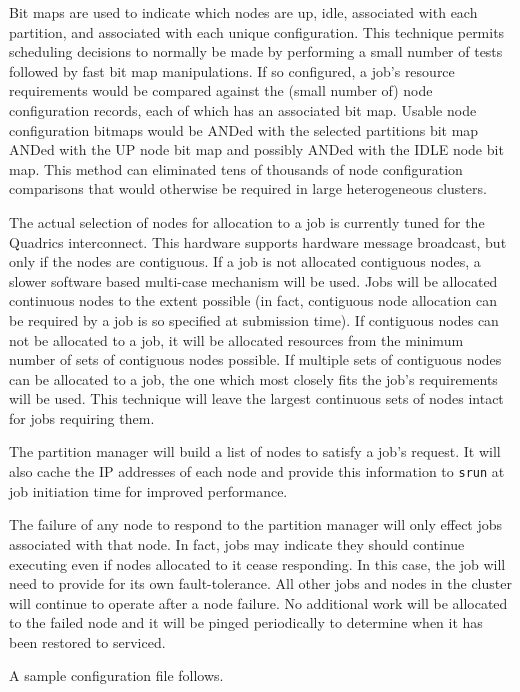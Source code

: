 Bit maps are used to indicate which nodes are up, idle, associated
with each partition, and associated with each unique configuration.
This technique permits scheduling decisions to normally be made by
performing a small number of tests followed by fast bit map manipulations. 
If so configured, a job's resource requirements would be compared 
against the (small number of) node configuration records, each of 
which has an associated bit map. Usable node configuration bitmaps 
would be ANDed with the selected partitions bit map ANDed with the 
UP node bit map and possibly ANDed with the IDLE node bit map. 
This method can eliminated tens of thousands of node configuration 
comparisons that would otherwise be required in large heterogeneous 
clusters.

The actual selection of nodes for allocation to a job is currently
tuned for the Quadrics interconnect.  This hardware supports hardware
message broadcast, but only if the nodes are contiguous.  If a job
is not allocated contiguous nodes, a slower software based multi-case
mechanism will be used.  Jobs will be allocated continuous nodes to the
extent possible (in fact, contiguous node allocation can be required
by a job is so specified at submission time).  If contiguous nodes
can not be allocated to a job, it will be allocated resources from
the minimum number of sets of contiguous nodes possible.  If multiple
sets of contiguous nodes can be allocated to a job, the one which most
closely fits the job's requirements will be used.  This technique will
leave the largest continuous sets of nodes intact for jobs requiring them.

The partition manager will build a list of nodes to satisfy a job's
request.  It will also cache the IP addresses of
each node and provide this information to {\tt srun} at job initiation
time for improved performance.

The failure of any node to respond to the partition manager will only
effect jobs associated with that node.  In fact, jobs may indicate they
should continue executing even if nodes allocated to it cease responding.
In this case, the job will need to provide for its own fault-tolerance.
All other jobs and nodes in the cluster will continue to operate after
a node failure.  No additional work will be allocated to the failed
node and it will be pinged periodically to determine when it has been
restored to serviced.

A sample configuration file follows.

